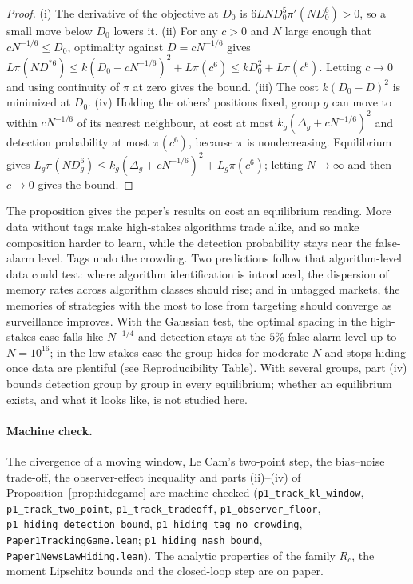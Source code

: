 \begin{proof}
(i) The derivative of the objective at $D_0$ is $6LND_0^5\pi'(ND_0^6)>0$, so a small move below $D_0$ lowers it. (ii) For any $c>0$ and $N$ large enough that $cN^{-1/6}\le D_0$, optimality against $D=cN^{-1/6}$ gives $L\pi(ND^{*6})\le k(D_0-cN^{-1/6})^2+L\pi(c^6)\le kD_0^2+L\pi(c^6)$. Letting $c\to0$ and using continuity of $\pi$ at zero gives the bound. (iii) The cost $k(D_0-D)^2$ is minimized at $D_0$. (iv) Holding the others' positions fixed, group $g$ can move to within $cN^{-1/6}$ of its nearest neighbour, at cost at most $k_g(\Delta_g+cN^{-1/6})^2$ and detection probability at most $\pi(c^6)$, because $\pi$ is nondecreasing. Equilibrium gives $L_g\pi(ND_g^6)\le k_g(\Delta_g+cN^{-1/6})^2+L_g\pi(c^6)$; letting $N\to\infty$ and then $c\to0$ gives the bound.
\end{proof}

The proposition gives the paper's results on cost an equilibrium reading. More data without tags make high-stakes algorithms trade alike, and so make composition harder to learn, while the detection probability stays near the false-alarm level. Tags undo the crowding. Two predictions follow that algorithm-level data could test: where algorithm identification is introduced, the dispersion of memory rates across algorithm classes should rise; and in untagged markets, the memories of strategies with the most to lose from targeting should converge as surveillance improves. With the Gaussian test, the optimal spacing in the high-stakes case falls like $N^{-1/4}$ and detection stays at the $5\%$ false-alarm level up to $N=10^{16}$; in the low-stakes case the group hides for moderate $N$ and stops hiding once data are plentiful (see Reproducibility Table). With several groups, part (iv) bounds detection group by group in every equilibrium; whether an equilibrium exists, and what it looks like, is not studied here.

\paragraph{Machine check.} The divergence of a moving window, Le Cam's two-point step, the bias--noise trade-off, the observer-effect inequality and parts (ii)--(iv) of Proposition~\ref{prop:hidegame} are machine-checked (\texttt{p1\_track\_kl\_window}, \texttt{p1\_track\_two\_point}, \texttt{p1\_track\_tradeoff}, \texttt{p1\_observer\_floor}, \texttt{p1\_hiding\_detection\_bound}, \texttt{p1\_hiding\_tag\_no\_crowding}, \nolinkurl{Paper1TrackingGame.lean}; \texttt{p1\_hiding\_nash\_bound}, \nolinkurl{Paper1NewsLawHiding.lean}). The analytic properties of the family $R_c$, the moment Lipschitz bounds and the closed-loop step are on paper.
